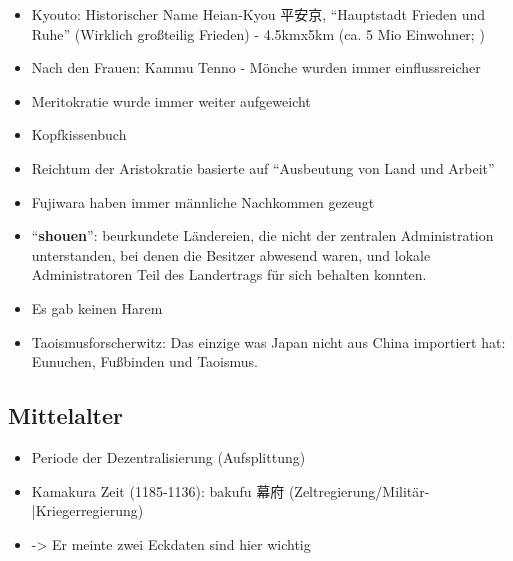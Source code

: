 \documentclass[emulatestandardclasses]{scrartcl}
\begin{document}
\begin{itemize}
  \item Kyouto: Historischer Name Heian-Kyou 平安京, "`Hauptstadt Frieden und Ruhe"' (Wirklich großteilig Frieden) - 4.5kmx5km (ca. 5 Mio Einwohner; )
  \item Nach den Frauen: Kammu Tenno - Mönche wurden immer einflussreicher
  \item Meritokratie wurde immer weiter aufgeweicht
  \item Kopfkissenbuch
  \item Reichtum der Aristokratie basierte auf "`Ausbeutung von Land und Arbeit"'
  \item Fujiwara haben immer männliche Nachkommen gezeugt
  \item "`\textbf{shouen}"': beurkundete Ländereien, die nicht der zentralen Administration unterstanden, bei denen die Besitzer abwesend waren, und lokale Administratoren Teil des Landertrags für sich behalten konnten.
  \item Es gab keinen Harem
  \item Taoismusforscherwitz: Das einzige was Japan nicht aus China importiert hat: Eunuchen, Fußbinden und Taoismus.
\end{itemize}

\subsection{Mittelalter}

\begin{itemize}
  \item Periode der Dezentralisierung (Aufsplittung)
  \item Kamakura Zeit (1185-1136): bakufu 幕府 (Zeltregierung/Militär-|Kriegerregierung)
  \item -> Er meinte zwei Eckdaten sind hier wichtig
\end{itemize}

\newpage
\end{document}
